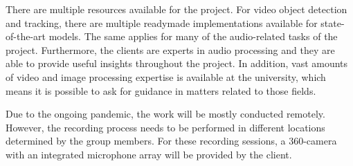 There are multiple resources available for the project. For video object detection and tracking, there are multiple
readymade implementations available for state-of-the-art models. The same applies for many of the audio-related
tasks of the project. Furthermore, the clients are experts in audio processing and they are able to provide useful
insights throughout the project. In addition, vast amounts of video and image processing expertise is available at
the university, which means it is possible to ask for guidance in matters related to those fields.

Due to the ongoing pandemic, the work will be mostly conducted remotely. However, the recording process needs to be
performed in different locations determined by the group members. For these recording sessions, a 360-camera with an
integrated microphone array will be provided by the client.